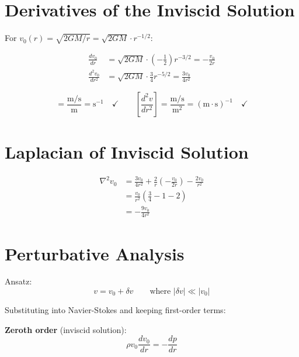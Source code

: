 \documentclass[12pt,a4paper,openany]{book}
\theoremstyle{definition}
\theoremstyle{plain}
\theoremstyle{remark}
\begin{document}
\section{Derivatives of the Inviscid Solution}

For $v_0(r) = \sqrt{2GM/r} = \sqrt{2GM} \cdot r^{-1/2}$:

\begin{align}
\frac{dv_0}{dr} &= \sqrt{2GM} \cdot \left(-\frac{1}{2}\right) r^{-3/2} = -\frac{v_0}{2r} \label{eq:dv0} \\
\frac{d^2v_0}{dr^2} &= \sqrt{2GM} \cdot \frac{3}{4} r^{-5/2} = \frac{3v_0}{4r^2} \label{eq:d2v0}
\end{align}

\begin{dimcheckbox}
\begin{equation}
[\frac{dv}{dr}] = \frac{\text{m/s}}{\text{m}} = \text{s}^{-1} \quad \checkmark \qquad [\frac{d^2v}{dr^2}] = \frac{\text{m/s}}{\text{m}^2} = (\text{m}\cdot\text{s})^{-1} \quad \checkmark
\end{equation}
\end{dimcheckbox}

\section{Laplacian of Inviscid Solution}

\begin{align}
\nabla^2 v_0 &= \frac{3v_0}{4r^2} + \frac{2}{r}\left(-\frac{v_0}{2r}\right) - \frac{2v_0}{r^2} \\
&= \frac{v_0}{r^2}\left(\frac{3}{4} - 1 - 2\right) \\
&= -\frac{9v_0}{4r^2}
\label{eq:laplacian_v0}
\end{align}

\section{Perturbative Analysis}

Ansatz:
\begin{equation}
v = v_0 + \delta v \qquad \text{where } |\delta v| \ll |v_0|
\label{eq:ansatz}
\end{equation}

Substituting into Navier-Stokes and keeping first-order terms:

\textbf{Zeroth order} (inviscid solution):
\begin{equation}
\rho v_0 \frac{dv_0}{dr} = -\frac{dp}{dr}
\end{equation}
\end{document}
